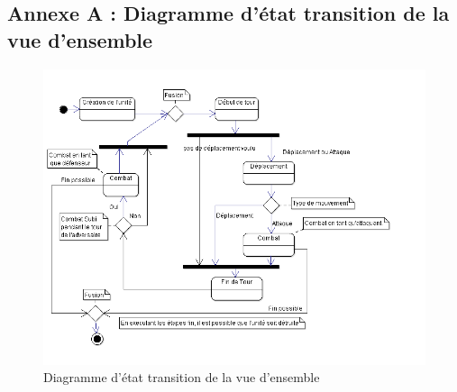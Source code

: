 
\subsection{Annexe A : Diagramme d'état transition de la vue d'ensemble}
\begin{figure}[!h]
\centering
\includegraphics[scale=0.70]{img/VueDensemble.png}
\caption{Diagramme d'état transition de la vue d'ensemble}
\end{figure}
\clearpage

